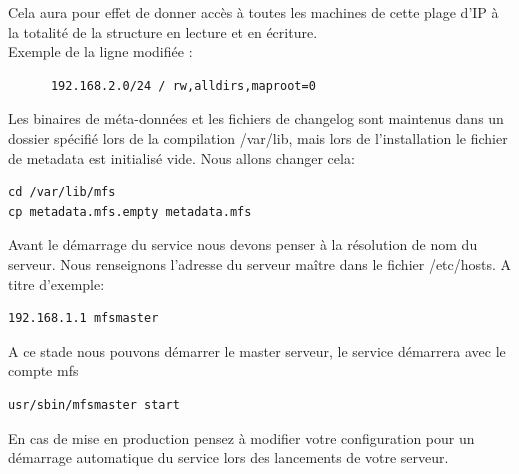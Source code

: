 \documentclass[12pt]{report}
\begin{document}
Cela aura pour effet de donner accès à toutes les machines de cette plage d'IP à la totalité de la structure en lecture et en écriture.\\
Exemple de la ligne modifiée :
\begin{lstlisting}
	  192.168.2.0/24 / rw,alldirs,maproot=0
	  \end{lstlisting}
Les binaires de méta-données et les fichiers de changelog sont maintenus dans un dossier spécifié lors de la compilation /var/lib, mais lors de l'installation le fichier de metadata est initialisé vide.
Nous allons changer cela: 
\begin{lstlisting}
cd /var/lib/mfs
cp metadata.mfs.empty metadata.mfs
	  \end{lstlisting}
Avant le démarrage du service nous devons penser à la résolution de nom du serveur. Nous renseignons l'adresse du serveur maître dans le fichier /etc/hosts.
A titre d'exemple:
  \begin{lstlisting}
192.168.1.1 mfsmaster
	  \end{lstlisting}
A ce stade nous pouvons démarrer le master serveur, le service démarrera avec le compte mfs
          \begin{lstlisting}
usr/sbin/mfsmaster start
	  \end{lstlisting}
En cas de mise en production pensez à modifier votre configuration pour un démarrage automatique du service lors des lancements de votre serveur.
\end{document}
